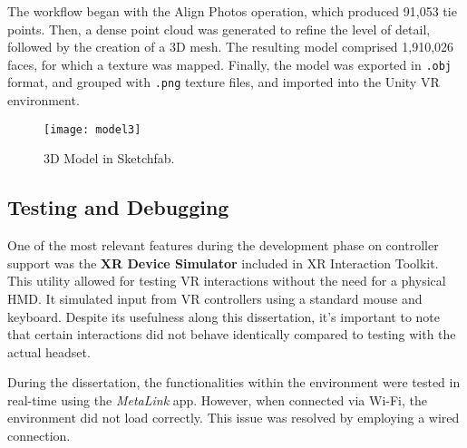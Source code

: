 The workflow began with the Align Photos operation, which produced 91,053 tie points. Then, a dense point cloud was generated to refine the level of detail, followed by the creation of a \gls{3D} mesh. The resulting model comprised 1,910,026 faces, for which a texture was mapped.
Finally, the model was exported in \texttt{.obj} format, and grouped with \texttt{.png} texture files, and imported into the Unity \gls{VR} environment.

\begin{figure}[h!]
    \centering
    \texttt{[image: model3]}
    \caption{\gls{3D} Model in Sketchfab.}
    \label{fig:model3}
\end{figure}


\subsection{Testing and Debugging}

One of the most relevant features during the development phase on controller support was the \textbf{XR Device Simulator} included in XR Interaction Toolkit. 
This utility allowed for testing \gls{VR} interactions without the need for a physical \gls{HMD}. 
It simulated input from \gls{VR} controllers using a standard mouse and keyboard. 
Despite its usefulness along this dissertation, it's important to note that certain interactions did not behave identically compared to testing with the actual headset.

During the dissertation, the functionalities within the environment were tested in real-time using the \emph{MetaLink} app. However, when connected via Wi-Fi, the environment did not load correctly. This issue was resolved by employing a wired connection.

